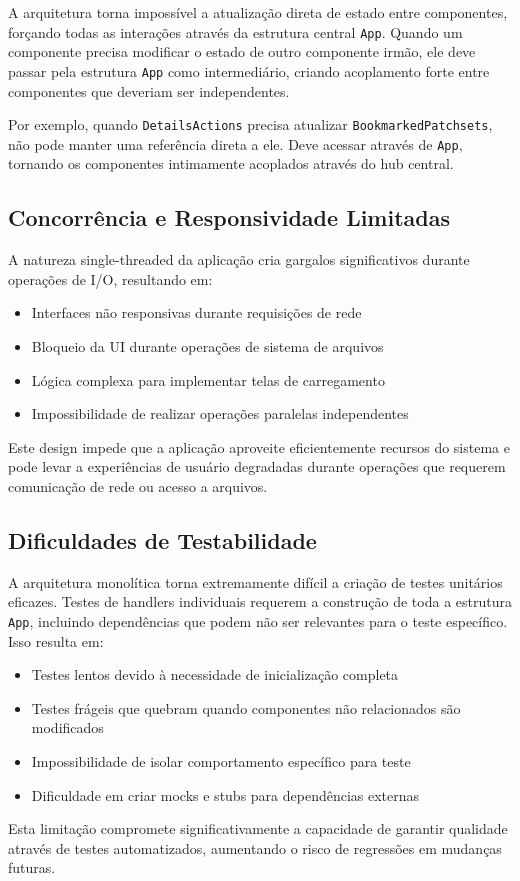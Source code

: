 A arquitetura torna impossível a atualização direta de estado entre componentes, forçando todas as interações através da estrutura central \texttt{App}. Quando um componente precisa modificar o estado de outro componente irmão, ele deve passar pela estrutura \texttt{App} como intermediário, criando acoplamento forte entre componentes que deveriam ser independentes.

Por exemplo, quando \texttt{DetailsActions} precisa atualizar \texttt{BookmarkedPatchsets}, não pode manter uma referência direta a ele. Deve acessar através de \texttt{App}, tornando os componentes intimamente acoplados através do hub central.

\subsection{Concorrência e Responsividade Limitadas}

A natureza single-threaded da aplicação cria gargalos significativos durante operações de I/O, resultando em:

\begin{itemize}
    \item Interfaces não responsivas durante requisições de rede
    \item Bloqueio da UI durante operações de sistema de arquivos
    \item Lógica complexa para implementar telas de carregamento
    \item Impossibilidade de realizar operações paralelas independentes
\end{itemize}

Este design impede que a aplicação aproveite eficientemente recursos do sistema e pode levar a experiências de usuário degradadas durante operações que requerem comunicação de rede ou acesso a arquivos.

\subsection{Dificuldades de Testabilidade}

A arquitetura monolítica torna extremamente difícil a criação de testes unitários eficazes. Testes de handlers individuais requerem a construção de toda a estrutura \texttt{App}, incluindo dependências que podem não ser relevantes para o teste específico. Isso resulta em:

\begin{itemize}
    \item Testes lentos devido à necessidade de inicialização completa
    \item Testes frágeis que quebram quando componentes não relacionados são modificados
    \item Impossibilidade de isolar comportamento específico para teste
    \item Dificuldade em criar mocks e stubs para dependências externas
\end{itemize}

Esta limitação compromete significativamente a capacidade de garantir qualidade através de testes automatizados, aumentando o risco de regressões em mudanças futuras.
